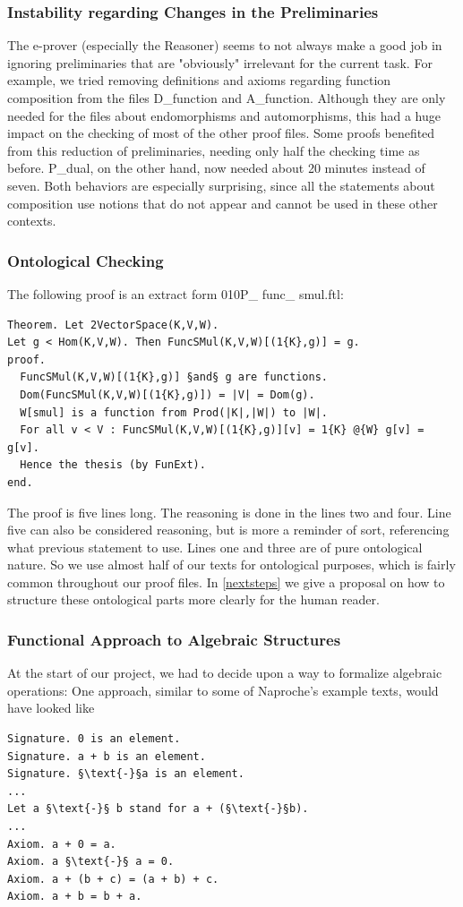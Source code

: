 \documentclass[11pt]{article}
\begin{document}
\subsubsection{Instability regarding Changes in the Preliminaries} \label{instabilites}
The e-prover (especially the Reasoner) seems to not always make a good job in ignoring preliminaries that are "obviously" irrelevant for the current task.
For example, we tried removing definitions and axioms regarding function composition from the files D\_function and A\_function. Although they are only needed for the files about endomorphisms and automorphisms, this had a huge impact on the checking of most of the other proof files.
Some proofs benefited from this reduction of preliminaries, needing only half the checking time as before.
P\_dual, on the other hand, now needed about 20 minutes instead of seven.
Both behaviors are especially surprising, since all the statements about composition use notions that do not appear and cannot be used in these other contexts.


\subsubsection{Ontological Checking} \label{ontologialChecking}
The following proof is an extract form 010P\_ func\_ smul.ftl:
\begin{lstlisting}
Theorem. Let 2VectorSpace(K,V,W).
Let g < Hom(K,V,W). Then FuncSMul(K,V,W)[(1{K},g)] = g.
proof.
  FuncSMul(K,V,W)[(1{K},g)] §and§ g are functions.
  Dom(FuncSMul(K,V,W)[(1{K},g)]) = |V| = Dom(g).
  W[smul] is a function from Prod(|K|,|W|) to |W|.
  For all v < V : FuncSMul(K,V,W)[(1{K},g)][v] = 1{K} @{W} g[v] = g[v].
  Hence the thesis (by FunExt).
end.
\end{lstlisting}
The proof is five lines long. The reasoning is done in the lines two and four. Line five can also be considered reasoning, but is more a reminder of sort, referencing what previous statement to use. Lines one and three are of pure ontological nature. So we use almost half of our texts for ontological purposes, which is fairly common throughout our proof files. In \ref{nextsteps} we give a proposal on how to structure these ontological parts more clearly for the human reader.


\subsubsection{Functional Approach to Algebraic Structures} \label{functionalapproach}
At the start of our project, we had to decide upon a way to formalize algebraic operations:
One approach, similar to some of Naproche's example texts, would have looked like
\begin{lstlisting}
Signature. 0 is an element.
Signature. a + b is an element.
Signature. §\text{-}§a is an element.
...
Let a §\text{-}§ b stand for a + (§\text{-}§b).
...
Axiom. a + 0 = a.
Axiom. a §\text{-}§ a = 0.
Axiom. a + (b + c) = (a + b) + c.
Axiom. a + b = b + a.
\end{lstlisting}
\end{document}
